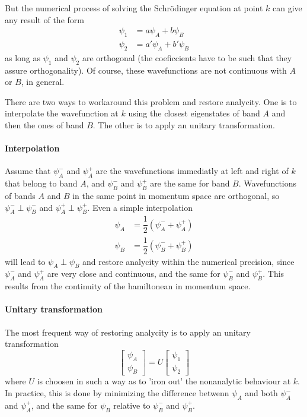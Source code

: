 \documentclass[a4paper,12pt]{report}
\begin{document}
But the numerical process of solving the Schr\"odinger equation at point $k$ can give any result of the form
\begin{align}
 \psi_1 &= a\psi_A + b\psi_B \\
 \psi_2 &= a'\psi_A + b'\psi_B
\end{align}
as long as $\psi_1$ and $\psi_2$ are orthogonal (the coeficcients have to be such that they assure orthogonality).
Of course, these wavefunctions are not continuous with $A$ or $B$, in general.

There are two ways to workaround this problem and restore analycity.
One is to interpolate the wavefunction at $k$ using the closest eigenstates of band $A$ and then the ones of band $B$.
The other is to apply an unitary transformation.

\paragraph*{Interpolation}
Assume that $\psi_A^-$ and $\psi_A^+$ are the wavefunctions immediatly at left and right of $k$ that belong to band $A$,
and $\psi_B^-$ and $\psi_B^+$ are the same for band $B$.
Wavefunctions of bands $A$ and $B$ in the same point in momentum space are orthogonal, so $\psi_A^- \perp \psi_B^-$
and $\psi_A^+ \perp \psi_B^+$.
Even a simple interpolation
\begin{align}
 \psi_A &= \dfrac{1}{2}\left( \psi_A^- + \psi_A^+\right) \\
 \psi_B &= \dfrac{1}{2}\left( \psi_B^- + \psi_B^+\right)
\end{align}
will lead to $\psi_A \perp \psi_B$ and restore analycity within the numerical precision,
since $\psi_A^-$ and $\psi_A^+$ are very close and continuous,
and the same for $\psi_B^-$ and $\psi_B^+$.
This results from the continuity of the hamiltonean in momentum space.


\paragraph*{Unitary transformation}
The most frequent way of restoring analycity is to apply an unitary transformation
\begin{equation}
 \left[ \begin{matrix}
  \psi_A\\\psi_B
 \end{matrix}\right] = U
 \left[ \begin{matrix}
  \psi_1\\\psi_2
 \end{matrix}\right]
\end{equation}
where $U$ is choosen in such a way as to 'iron out' the nonanalytic behaviour at $k$.
In practice, this is done by minimizing the difference betwenn $\psi_A$ and both $\psi_A^-$ and $\psi_A^+$,
and the same for $\psi_B$ relative to $\psi_B^-$ and $\psi_B^+$.
\end{document}
